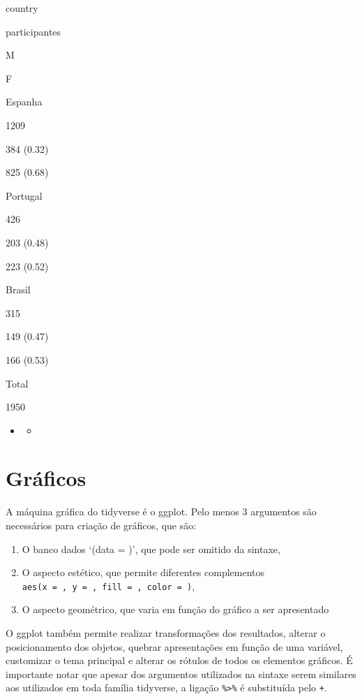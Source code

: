 \documentclass[
]{book}
\providecommand{\tightlist}{%
  \setlength{\itemsep}{0pt}\setlength{\parskip}{0pt}}
\begin{document}
country

participantes

M

F

Espanha

1209

384 (0.32)

825 (0.68)

Portugal

426

203 (0.48)

223 (0.52)

Brasil

315

149 (0.47)

166 (0.53)

Total

1950

\begin{itemize}
\item
  \begin{itemize}
  \item
  \end{itemize}
\end{itemize}

\hypertarget{gruxe1ficos}{%
\section{Gráficos}\label{gruxe1ficos}}

A máquina gráfica do tidyverse é o ggplot. Pelo menos 3 argumentos são necessários para criação de gráficos, que são:

\begin{enumerate}
\def\labelenumi{\arabic{enumi}.}
\tightlist
\item
  O banco dados `(data = )', que pode ser omitido da sintaxe,\\
\item
  O aspecto estético, que permite diferentes complementos \texttt{aes(x\ =\ ,\ y\ =\ ,\ fill\ =\ ,\ color\ =\ )},\\
\item
  O aspecto geométrico, que varia em função do gráfico a ser apresentado
\end{enumerate}

O ggplot também permite realizar transformações dos resultados, alterar o posicionamento dos objetos, quebrar apresentações em função de uma variável, customizar o tema principal e alterar os rótulos de todos os elementos gráficos. É importante notar que apesar dos argumentos utilizados na sintaxe serem similares aos utilizados em toda família tidyverse, a ligação \texttt{\%\textgreater{}\%} é substituída pelo \texttt{+}.
\end{document}
